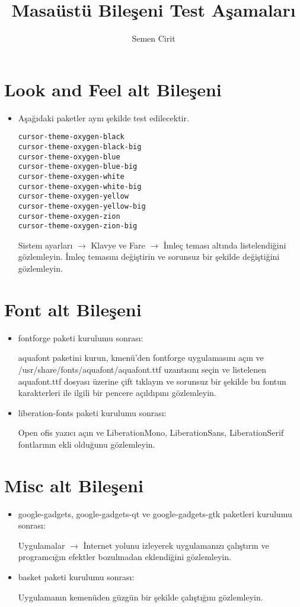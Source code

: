 \documentclass[a4paper,10pt]{article}
\title{Masaüstü Bileşeni Test Aşamaları}
\author{Semen Cirit}
\begin{document}
\maketitle

\section{Look and Feel alt Bileşeni}
\begin{itemize}
 \item Aşağıdaki paketler aynı şekilde test edilecektir.
\begin{verbatim}
cursor-theme-oxygen-black
cursor-theme-oxygen-black-big
cursor-theme-oxygen-blue
cursor-theme-oxygen-blue-big
cursor-theme-oxygen-white
cursor-theme-oxygen-white-big
cursor-theme-oxygen-yellow
cursor-theme-oxygen-yellow-big
cursor-theme-oxygen-zion
cursor-theme-oxygen-zion-big
\end{verbatim}

Sistem ayarları $\rightarrow$  Klavye ve Fare $\rightarrow$ İmleç teması altında listelendiğini gözlemleyin. İmleç temasını değiştirin ve sorunsuz bir şekilde değiştiğini gözlemleyin.

\end{itemize}


\section{Font alt Bileşeni}
\begin{itemize}
 \item fontforge paketi kurulumu sonrası:

aquafont paketini kurun, kmenü'den fontforge uygulamasını açın ve /usr/share/fonts/aquafont/aquafont.ttf uzantısını seçin ve listelenen aquafont.ttf  dosyası üzerine çift tıklayın ve sorunsuz bir şekilde bu fontun karakterleri ile ilgili bir pencere açıldıpını gözlemleyin.
\item liberation-fonts paketi kurulumu sonrası:

Open ofis yazıcı açın ve LiberationMono, LiberationSans, LiberationSerif fontlarının ekli olduğunu gözlemleyin.
\end{itemize}

\section{Misc alt Bileşeni}
\begin{itemize}
\item google-gadgets, google-gadgets-qt ve google-gadgets-gtk paketleri kurulumu sonrası:

Uygulamalar $\rightarrow$ İnternet yolunu izleyerek uygulamanızı çalıştırın ve programcığın efektler bozulmadan eklendiğini gözlemleyin.

\item basket paketi kurulumu sonrası:

Uygulamanın kemenüden güzgün bir şekilde çalıştığını gözlemleyin.

\end{itemize}
\end{document}
